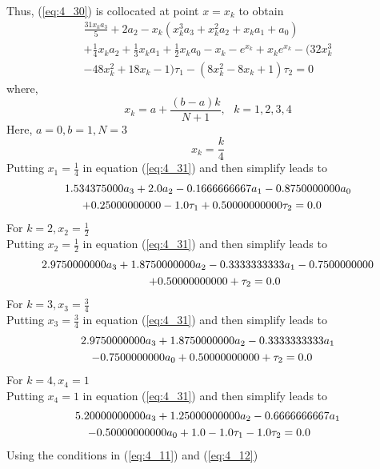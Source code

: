 \documentclass[12pt]{report}
\newcommand{\sps}{\\[0.2cm]}
\newcommand{\refn}[1]{(\ref{#1})}
\newcommand{\refx}[1]{\refn{eq:#1}}
\newcommand{\dsp}{\displaystyle}
\begin{document}
	Thus, \refx{4_30} is collocated at point $x=x_k$ to obtain
	\begin{equation}
		\begin{array}{l}
			\dsp \frac{31x_ka_3}{5} + 2a_2 -x_k(x_k^3a_3 + x_k^2a_2 + x_ka_1 + a_0)\\
			+\frac{1}{4}x_ka_2 + \frac{1}{3}x_ka_1 + \frac{1}{2}x_ka_0 - x_k - e^{x_k} + x_ke^{x_k}-(32x_k^3\\
			-48x_k^2 + 18x_k - 1)\tau_1 - (8x_k^2 - 8x_k + 1)\tau_2 = 0
		\end{array}
		\label{eq:4_31}
	\end{equation}
	where,
	\begin{equation}
		x_k = a + \frac{(b-a)k}{N+1}, ~~~ k=1,2,3,4 \label{eq:4_32}
	\end{equation}
	Here, $a=0, b=1, N=3$\sps
	\begin{equation*}
		x_k = \frac{k}{4}
	\end{equation*}
	Putting $x_1=\frac{1}{4}$ in equation \refx{4_31} and then simplify leads to
	\begin{eqnarray}
		1.534375000a_3 + 2.0a_2 - 0.1666666667a_1 - 0.8750000000a_0\notag\\
		+ 0.25000000000 - 1.0\tau_1 + 0.50000000000\tau_2 = 0.0~~~~~~~~ \label{eq:4_33}
	\end{eqnarray}
	For $k=2, x_2 = \frac{1}{2}$\sps
	Putting $x_2 = \frac{1}{2}$ in equation \refx{4_31} and then simplify leads to 
	\begin{eqnarray}
		2.9750000000a_3 + 1.8750000000a_2 - 0.3333333333a_1 - 0.7500000000\notag\\
		+ 0.50000000000 + \tau_2 = 0.0~~~~~~~~~~~~~~~~~~~~~~~~~ \label{eq:4_34}
	\end{eqnarray}
	For $k=3, x_3 = \frac{3}{4}$\sps
	Putting $x_3 = \frac{3}{4}$ in equation \refx{4_31} and then simplify leads to 
	\begin{eqnarray}
		2.9750000000a_3 + 1.8750000000a_2 - 0.3333333333a_1\notag\\ - 0.7500000000a_0 + 0.50000000000 + \tau_2 = 0.0~~~~~~\label{eq:4_35}
	\end{eqnarray}
	For $k=4, x_4 = 1$\sps
	Putting $x_4 = 1$ in equation \refx{4_31} and then simplify leads to 
	\begin{eqnarray}
		5.20000000000a_3 + 1.25000000000a_2 - 0.6666666667a_1\notag\\
		- 0.50000000000a_0 + 1.0 - 1.0\tau_1 - 1.0\tau_2 = 0.0~~~~~~~~ \label{eq:4_36}
	\end{eqnarray}
	Using the conditions in \refx{4_11} and \refx{4_12}
\end{document}
